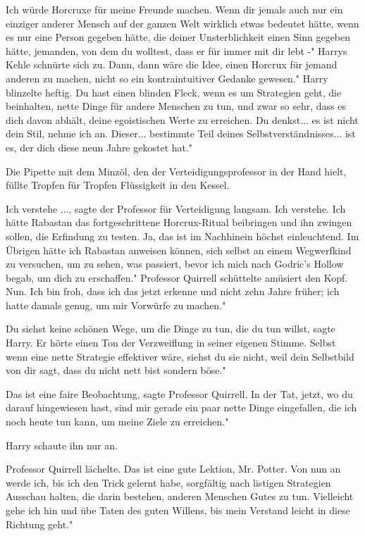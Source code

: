 \glqq{}Ich würde Horcruxe für meine Freunde machen. Wenn dir jemals auch nur ein
einziger anderer Mensch auf der ganzen Welt wirklich etwas bedeutet hätte, wenn
es nur eine Person gegeben hätte, die deiner Unsterblichkeit einen Sinn gegeben
hätte, jemanden, von dem du wolltest, dass er für immer mit dir lebt -" Harrys
Kehle schnürte sich zu. \glqq{}Dann, dann wäre die Idee, einen Horcrux für jemand
anderen zu machen, nicht so ein kontraintuitiver Gedanke gewesen." Harry
blinzelte heftig. \glqq{}Du hast einen blinden Fleck, wenn es um Strategien geht,
die beinhalten, nette Dinge für andere Menschen zu tun, und zwar so sehr, dass
es dich davon abhält, deine egoistischen Werte zu erreichen. Du denkst... es ist
nicht dein Stil, nehme ich an. Dieser... bestimmte Teil deines
Selbstverständnisses... ist es, der dich diese neun Jahre gekostet hat."

Die Pipette mit dem Minzöl, den der Verteidigungsprofessor in der Hand hielt,
füllte Tropfen für Tropfen Flüssigkeit in den Kessel.

\glqq{}Ich verstehe ...\grqq{}, sagte der Professor für Verteidigung langsam.
\glqq{}Ich verstehe. Ich hätte Rabastan das fortgeschrittene Horcrux-Ritual
beibringen und ihn zwingen sollen, die Erfindung zu testen. Ja, das ist im
Nachhinein höchst einleuchtend. Im Übrigen hätte ich Rabastan anweisen können,
sich selbst an einem Wegwerfkind zu versuchen, um zu sehen, was passiert, bevor
ich mich nach Godric's Hollow begab, um dich zu erschaffen." Professor Quirrell
schüttelte amüsiert den Kopf. \glqq{}Nun. Ich bin froh, dass ich das jetzt
erkenne und nicht zehn Jahre früher; ich hatte damals genug, um mir Vorwürfe zu
machen."

\glqq{}Du siehst keine schönen Wege, um die Dinge zu tun, die du tun
willst\grqq{}, sagte Harry. Er hörte einen Ton der Verzweiflung in seiner
eigenen Stimme. \glqq{}Selbst wenn eine nette Strategie effektiver wäre, siehst
du sie nicht, weil dein Selbstbild von dir sagt, dass du nicht nett bist sondern
böse."

\glqq{}Das ist eine faire Beobachtung\grqq{}, sagte Professor Quirrell. \glqq{}In
der Tat, jetzt, wo du darauf hingewiesen hast, sind mir gerade ein paar nette
Dinge eingefallen, die ich noch heute tun kann, um meine Ziele zu erreichen."

Harry schaute ihn nur an.

Professor Quirrell lächelte. \glqq{}Das ist eine gute Lektion, Mr. Potter. Von
nun an werde ich, bis ich den Trick gelernt habe, sorgfältig nach listigen
Strategien Ausschau halten, die darin bestehen, anderen Menschen Gutes zu tun.
Vielleicht gehe ich hin und übe Taten des guten Willens, bis mein Verstand
leicht in diese Richtung geht."

